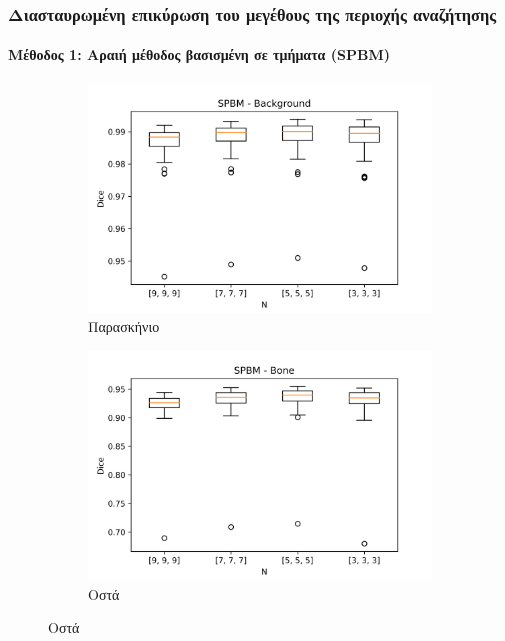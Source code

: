 \documentclass{beamer}
\begin{document}
\begin{frame}
\frametitle{Διασταυρωμένη επικύρωση του μεγέθους της περιοχής αναζήτησης}
\framesubtitle{Μέθοδος 1: Αραιή μέθοδος βασισμένη σε τμήματα (SPBM)}

\begin{figure}[H]
    \centering

    \begin{subfigure}[b]{0.42\linewidth}
    \includegraphics[width=\linewidth]{SPBM_N_Background_plot.png}
    \caption{Παρασκήνιο}
    \end{subfigure}
    \begin{subfigure}[b]{0.42\linewidth}
    \includegraphics[width=\linewidth]{SPBM_N_Bone_plot.png}
    \caption{Οστά}
    \end{subfigure}


\end{figure}
\end{frame}
\end{document}
